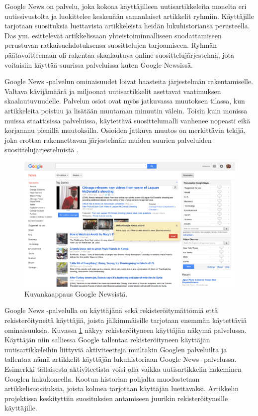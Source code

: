 \documentclass[12pt,finnish]{tktltiki2}
\theoremstyle{definition}
\theoremstyle{remark}
\begin{document}
Google News on palvelu, joka kokoaa käyttäjilleen uutisartikkeleita monelta eri uutissivustolta ja luokittelee keskenään samanlaiset artikkelit ryhmiin. Käyttäjille tarjotaan suosituksia luettavista artikkeleista heidän lukuhistoriansa perusteella. Das ym. \cite{Das:2007:GNP:1242572.1242610} esittelevät artikkelissaan yhteistoiminnalliseen suodattamiseen perustuvan ratkaisuehdotuksensa suosittelujen tarjoamiseen. Ryhmän päätavoitteenaan oli rakentaa skaalautuva online-suosittelujärjestelmä, jota voitaisiin käyttää suurissa palveluissa kuten Google Newsissä.

Google News -palvelun ominaisuudet loivat haasteita järjestelmän rakentamiselle. Valtava kävijämäärä ja miljoonat uutisartikkelit asettavat vaatimuksen skaalautuvuudelle. Palvelun osiot ovat myös jatkuvassa muutoksen tilassa, kun artikkeleita poistuu ja lisätään muutaman minuutin välein. Toisin kuin monissa muissa staattisissa palveluissa, käytettävä suosittelumalli vanhenee nopeasti eikä korjaannu pienillä muutoksilla. Osioiden jatkuva muutos on merkittävin tekijä, joka erottaa rakennettavan järjestelmän muiden suurien palveluiden suosittelujärjestelmistä \cite{Das:2007:GNP:1242572.1242610}.
\begin{figure}[]
\includegraphics[width = 390pt]{googlenews.eps}\caption{Kuvankaappaus Google Newsistä.}
\label{googlenews}
\end{figure} 

Google News -palvelulla on käyttäjänä sekä rekisteröitymättömiä että rekisteröityneitä käyttäjiä, joista jälkimmäisille tarjotaan enemmän käytettäviä ominaisuuksia. Kuvassa \ref{googlenews} näkyy rekisteröityneen käyttäjän näkymä palvelussa. Käyttäjän niin salliessa Google tallentaa rekisteröityneen käyttäjän uutisartikkeleihin liittyviä aktiviteetteja muiltakin Googlen palveluilta ja tallentaa nämä artikkelit käyttäjän lukuhistoriaan Google News -palvelussa. Esimerkki tällaisesta aktiviteetista voisi olla vaikka uutisartikkelin hakeminen Googlen hakukoneella. Kootun historian pohjalta muodostetaan artikkelisuosituksia, joista kolmea tarjotaan käyttäjän luettavaksi. Artikkelin projektissa keskityttiin suosituksien antamiseen juurikin rekisteröityneille käyttäjille. 
\end{document}

